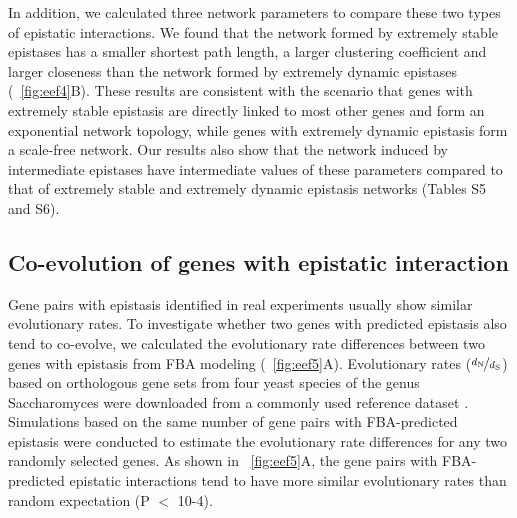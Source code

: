 
In addition, we calculated three network parameters to compare these
two types of epistatic interactions. We found that the network formed
by extremely stable epistases has a smaller shortest path length, a
larger clustering coefficient and larger closeness than the network
formed by extremely dynamic epistases (\Fig~\ref{fig:eef4}B). These results are
consistent with the scenario that genes with extremely stable
epistasis are directly linked to most other genes and form an
exponential network topology, while genes with extremely dynamic
epistasis form a scale-free network. Our results also show that the
network induced by intermediate epistases have intermediate values of
these parameters compared to that of extremely stable and extremely
dynamic epistasis networks (Tables S5 and S6).

\subsection{Co-evolution of genes with epistatic interaction}

Gene pairs with epistasis identified in real experiments usually show
similar evolutionary rates. To investigate whether two genes with
predicted epistasis also tend to co-evolve, we calculated the
evolutionary rate differences between two genes with epistasis from
FBA modeling (\Fig~\ref{fig:eef5}A). Evolutionary rates
($\nicefrac{d_\textnormal{N}}{d_\textnormal{S}}$) based on orthologous
gene sets
from four yeast species of the genus Saccharomyces were downloaded
from a commonly used reference dataset \citep{Wall2005}. Simulations
based on the same number of gene pairs with FBA-predicted epistasis
were conducted to estimate the evolutionary rate differences for any
two randomly selected genes. As shown in \Fig~\ref{fig:eef5}A, the gene pairs
with FBA-predicted epistatic interactions tend to have more similar
evolutionary rates than random expectation (P $<$ 10-4).



